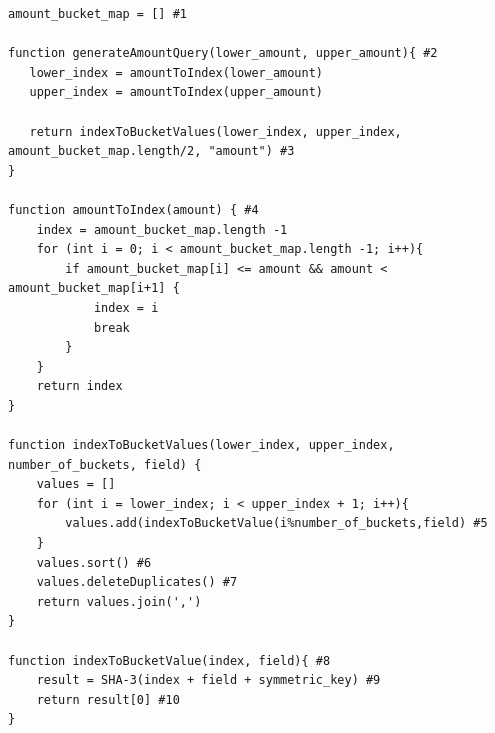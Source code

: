 \documentclass[a4paper]{article}
\begin{document}
\begin{verbatim}
amount_bucket_map = [] #1

function generateAmountQuery(lower_amount, upper_amount){ #2
   lower_index = amountToIndex(lower_amount)
   upper_index = amountToIndex(upper_amount)
   
   return indexToBucketValues(lower_index, upper_index, amount_bucket_map.length/2, "amount") #3
}

function amountToIndex(amount) { #4
    index = amount_bucket_map.length -1
    for (int i = 0; i < amount_bucket_map.length -1; i++){
        if amount_bucket_map[i] <= amount && amount < amount_bucket_map[i+1] {
            index = i
            break
        }
    }
    return index
}
    
function indexToBucketValues(lower_index, upper_index, number_of_buckets, field) {
    values = []
    for (int i = lower_index; i < upper_index + 1; i++){
        values.add(indexToBucketValue(i%number_of_buckets,field) #5
    }        
    values.sort() #6
    values.deleteDuplicates() #7
    return values.join(',')
}
     
function indexToBucketValue(index, field){ #8
    result = SHA-3(index + field + symmetric_key) #9
    return result[0] #10
}
    
\end{verbatim}
\end{document}
